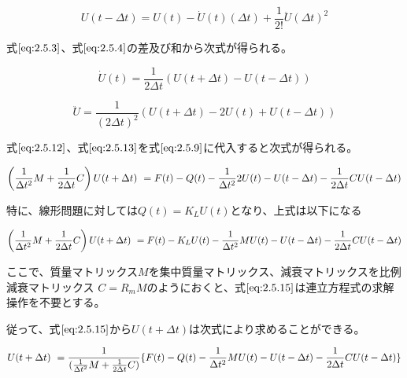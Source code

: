 \documentclass[a4paper,pandoc,ja=standard]{bxjsarticle}
\begin{document}
\begin{equation}
U(t-\Delta{t})=U(t)-\dot{U}(t)(\Delta{t})
+\frac{1}{2!}\ddot{U}(\Delta{t})^2
\label{eq:2.5.11}
\end{equation}

式\(\eqref{eq:2.5.3}\)、式\(\eqref{eq:2.5.4}\)の差及び和から次式が得られる。

\begin{equation}
\dot{U}(t)=\frac{1}{2\Delta{t}}
(U(t+\Delta{t})-U(t-\Delta{t}))
\label{eq:2.5.12}
\end{equation}

\begin{equation}
\ddot{U}=
\frac{1}{(2\Delta{t})^2}
(U(t+\Delta{t})-2U(t)+U(t-\Delta{t}))
\label{eq:2.5.13}
\end{equation}

式\(\eqref{eq:2.5.12}\)、式\(\eqref{eq:2.5.13}\)を式\(\eqref{eq:2.5.9}\)に代入すると次式が得られる。

\begin{equation}
\left( \frac{1}{\Delta t^{2}} M + \frac{1}{2\Delta t} C \right) U ( t + \Delta t ) \\\
= F(t) - Q(t) - \frac{1}{\Delta t^{2}} 2 U(t) - U( t - \Delta t) - \frac{1}{2\Delta t} C U(t - \Delta t)
\label{eq:2.5.14}
\end{equation}

特に、線形問題に対しては\(Q(t) = K_L U(t)\)となり、上式は以下になる

\begin{equation}
\left( \frac{1}{\Delta t^{2}} M + \frac{1}{2\Delta t} C \right) U( t + \Delta t ) \\\
= F(t) - K_L U(t) - \frac{1}{\Delta t^{2}} M U(t) - U(t - \Delta t) - \frac{1}{2\Delta t} C U (t - \Delta t)
\label{eq:2.5.15}
\end{equation}

ここで、質量マトリックス\(M\)を集中質量マトリックス、減衰マトリックスを比例減衰マトリックス \(C = R_m M\)のようにおくと、式\(\eqref{eq:2.5.15}\)は連立方程式の求解操作を不要とする。

従って、式\(\eqref{eq:2.5.15}\)から\(U(t+\Delta t)\)は次式により求めることができる。

\begin{equation}
U( t + \Delta t ) \\\
= \frac{1}{( \frac{1}{\Delta t^{2}} M + \frac{1}{2\Delta t} C )} \{ F(t) - Q(t) - \frac{1}{\Delta t^{2}} M U(t) - U(t - \Delta t) - \frac{1}{2\Delta t} C U(t - \Delta t) \}
\label{eq:2.5.17}
\end{equation}
\end{document}

